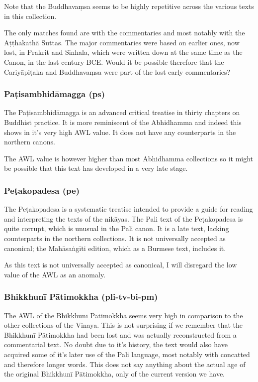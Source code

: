 \medskip
Note that the Buddhavaṃsa seems to be highly repetitive across the various texts in this collection.

The only matches found are with the commentaries and most notably with the Aṭṭhakathā Suttas. The major commentaries were based on earlier ones, now lost, in Prakrit and Sinhala, which were written down at the same time as the Canon, in the last century BCE. Would it be possible therefore that the Cariyāpiṭaka and Buddhavaṃsa were part of the lost early commentaries?

\subsubsection{Paṭisambhidāmagga (ps)}
The Paṭisambhidāmagga is an advanced critical treatise in thirty chapters on Buddhist practice. It is more reminiscent of the Abhidhamma and indeed this shows in it's very high AWL value. It does not have any counterparts in the northern canons.

The AWL value is however higher than most Abhidhamma collections so it might be possible that this text has developed in a very late stage.

\subsubsection{Peṭakopadesa (pe)}
The Peṭakopadesa is a systematic treatise intended to provide a guide for reading and interpreting the texts of the nikāyas. The Pali text of the Peṭakopadesa is quite corrupt, which is unusual in the Pali canon. It is a late text, lacking counterparts in the northern collections. It is not universally accepted as canonical; the Mahāsaṅgīti edition, which as a Burmese text, includes it.

As this text is not universally accepted as canonical, I will disregard the low value of the AWL as an anomaly.

\subsubsection{Bhikkhunī Pātimokkha (pli-tv-bi-pm)}
The AWL of the Bhikkhunī Pātimokkha seems very high in comparison to the other collections of the Vinaya. This is not surprising if we remember that the Bhikkhunī Pātimokkha had been lost and was actually reconstructed from a commentarial text. No doubt due to it's history, the text would also have acquired some of it's later use of the Pali language, most notably with concatted and therefore longer words. This does not say anything about the actual age of the original Bhikkhunī Pātimokkha, only of the current version we have.

